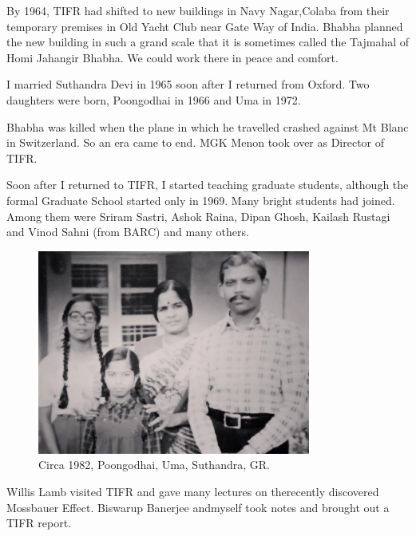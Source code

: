 By 1964, TIFR had shifted to new buildings in Navy Nagar,\break Colaba from 
their temporary premises in Old Yacht Club near Gate Way of India. 
Bhabha planned the new building in such a grand scale that it is 
sometimes called the Tajmahal of Homi Jahangir Bhabha. We could work 
there in peace and comfort.

I married Suthandra Devi in 1965 soon after I 
returned from Oxford. Two daughters were born, Poongodhai in 1966 and 
Uma in 1972.

Bhabha was killed when the plane in which he travelled crashed against 
Mt Blanc in Switzerland. So an era came to end. MGK Menon took over as 
Director of TIFR.

Soon after I returned to TIFR, I started teaching graduate students, 
although the formal Graduate School started only in 1969. Many bright 
students had joined. Among them were Sriram Sastri, Ashok Raina, Dipan 
Ghosh, Kailash Rustagi and Vinod Sahni (from BARC) and many others.
\smallskip

\begin{figure}[H]
\centering
\includegraphics[width=0.8\textwidth]{images/Rajaji-03.jpg}
\caption{\small{Circa 1982, Poongodhai, Uma, Suthandra, GR.}}
\end{figure}

Willis Lamb visited TIFR and gave many lectures on the\break recently 
discovered Mossbauer Effect. Biswarup Banerjee and\break myself took notes and 
brought out a TIFR report.
                 
